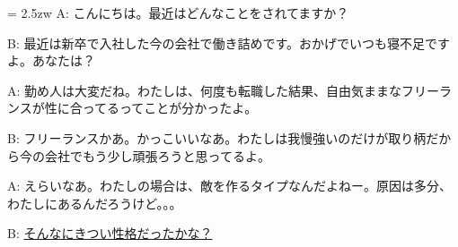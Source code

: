 \documentclass[11pt]{amsart}
\title{}
\author{}
\newenvironment{hangall}[1]{\hangindent = 2.5zw\everypar{\hangindent = 2.5zw}}{}
\begin{document}
\maketitle
\begin{hangall}{}%
A: こんにちは。最近はどんなことをされてますか？

B: 最近は新卒で入社した今の会社で働き詰めです。おかげでいつも寝不足ですよ。あなたは？

A: 勤め人は大変だね。わたしは、何度も転職した結果、自由気ままなフリーランスが性に合ってるってことが分かったよ。

B: フリーランスかあ。かっこいいなあ。わたしは我慢強いのだけが取り柄だから今の会社でもう少し頑張ろうと思ってるよ。

A: えらいなあ。わたしの場合は、敵を作るタイプなんだよねー。原因は多分、わたしにあるんだろうけど。。。

B: \ul{そんなにきつい性格だったかな？}\end{hangall}
\end{document}
